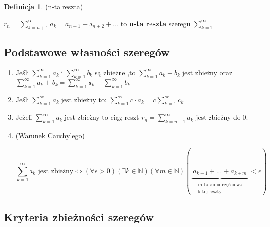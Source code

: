 \documentclass{article}
\theoremstyle{definition}
\newtheorem{de}{Definicja}[subsection]
\theoremstyle{definition}
\theoremstyle{definition}
\begin{document}
\begin{de}
(n-ta reszta)

$ r_n = \sum_{k=n+1}^{\infty} a_k = a_{n+1} + a_{n+2} + ... $
to \textbf{n-ta reszta} szeregu $ \sum_{k=1}^{\infty} $
\end{de}

\subsection{Podstawowe własności szeregów}

\begin{enumerate}
\item Jeśli $ \sum_{k=1}^{\infty}a_k $ i $ \sum_{k=1}^{\infty}b_k $
      są zbieżne ,to $ \sum_{k=1}^{\infty}a_k+b_k $ jest zbieżny
      oraz $ \sum_{k=1}^{\infty}a_k+b_k =  \sum_{k=1}^{\infty}a_k +
      \sum_{k=1}^{\infty}b_k$
\item Jeśli $ \sum_{k=1}^{\infty}a_k $ jest zbieżny to:
      $ \sum_{k=1}^{\infty}c \cdot a_k = 
      c \sum_{k=1}^{\infty}a_k $
\item Jeżeli $ \sum_{k=1}^{\infty}a_k $ jest zbieżny to ciąg reszt
      $ r_n = \sum_{k=n+1}^{\infty}a_k $ jest zbieżny do 0.
\item (Warunek Cauchy'ego)

      $$
      \sum_{k=1}^{\infty}a_k \text{ jest zbieżny}
      \iff
      (\forall \epsilon>0)(\exists k \in \mathbb{N})(\forall m \in \mathbb{N})
      (\underbrace{|a_{k+1}+ ... + a_{k+m}|}
      _{\substack{\text{m-ta suma częściowa}\\ \text{k-tej reszty}}}
      < \epsilon)
      $$
\end{enumerate}

\subsection{Kryteria zbieżności szeregów}
\end{document}
